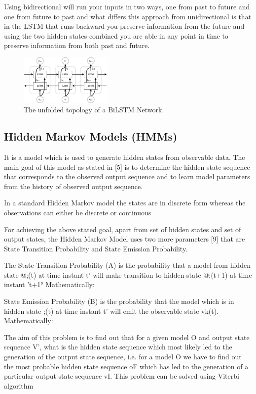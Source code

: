 \documentclass[conference]{IEEEtran}
\begin{document}
Using bidirectional will run your inputs in two ways, one from past to future and one from future to past and what differs this approach from unidirectional is that in the LSTM that runs backward you preserve information from the future and using the two hidden states combined you are able in any point in time to preserve information from both past and future.

\begin{figure}[htbp]
  \centering
  \includegraphics[width=0.4\textwidth]{BiLSTM.eps}
  \caption{The unfolded topology of a BiLSTM Network.}
  \label{fig:figure1}
\end{figure}

\subsection{Hidden Markov Models (HMMs)}

It is a model which is used to generate hidden states from observable data. The main goal of this model as stated in [5] is to determine the hidden state sequence that corresponds to the observed output sequence and to learn model parameters from the history of observed output sequence.

In a standard Hidden Markov model the states are in discrete form whereas the observations can either be discrete or continuous

For achieving the above stated goal, apart from set of hidden states and set of output states, the Hidden Markov Model uses two more parameters [9] that are State Transition Probability and State Emission Probability.

The State Transition Probability (A) is the probability that a model from hidden state @;(t) at time instant t' will make transition to hidden state @;(t+1) at time instant 't+1° Mathematically:

State Emission Probability (B) is the probability that the model which is in hidden state ;(t) at time instant t' will emit the observable state vk(t). Mathematically:

The aim of this problem is to find out that for a given model O and output state sequence V', what is the hidden state sequence which most likely led to the generation of the output state sequence, i.e. for a model O we have to find out the most probable hidden state sequence oF which has led to the generation of a particular output state sequence vI.
This
problem can be solved using Viterbi algorithm
\end{document}
